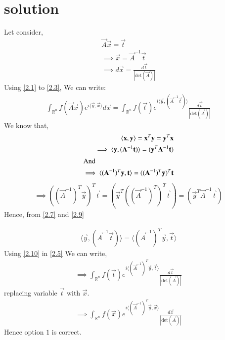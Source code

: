\documentclass[journal,12pt,twocolumn]{IEEEtran}
\numberwithin{table}{section}
\begin{document}
	\section{solution}
Let consider,
\begin{align}
\vec{A}\vec{x} = \vec{t} \label{2.1}\\
\implies \vec{x} = \vec{A}^{-1}\vec{t} \label{2.2}\\
\implies d\vec{x} = \frac{d\vec{t}}{ \left | \text{det} (\vec{A}) \right |} \label{2.3}
\end{align}
Using  \eqref{2.1} to \eqref{2.3}, We can write: 
\begin{multline}
\int_{\mathbb{R}^n} f(\vec{A}\vec{x}) e^{i\langle \vec{y},\vec{x}\rangle} d\vec{x}  = \int_{\mathbb{R}^n} f(\vec{t}) e^{i \langle \vec{y},(\vec{A}^{-1}\vec{t})\rangle} \frac{d\vec{t}}{\left| \text{det}(\vec{A}) \right|} \label{2.5}
\end{multline}
We know that,
\begin{align}
\langle \vec{x},\vec{y} \rangle = \vec{x}^T\vec{y} = \vec{y}^T\vec{x}\\
\implies \langle \vec{y}, (\vec{A}^{-1}\vec{t})\rangle = (\vec{y}^T\vec{A}^{-1}\vec{t}) \label{2.7}\\
\intertext{And}
\implies  \langle (\vec{A}^{-1})^{T}\vec{y},\vec{t}\rangle = ((\vec{A}^{-1})^{T}\vec{y})^T\vec{t}
\end{align}
\begin{multline}
\implies   ((\vec{A}^{-1})^T\vec{y})^T\vec{t} = (\vec{y}^T((\vec{A}^{-1})^T)^T\vec{t}) = (\vec{y}^T\vec{A}^{-1}\vec{t}) \label{2.9}
\end{multline}
Hence, from \eqref{2.7} and \eqref{2.9}

\begin{align}
 \langle \vec{y}, (\vec{A}^{-1}\vec{t})\rangle  =  \langle(\vec{A}^{-1})^{T}\vec{y},\vec{t} \rangle    \label{2.10}
\end{align}
Using \eqref{2.10} in \eqref{2.5} We can write,
\begin{align}
\implies \int_{\mathbb{R}^n} f(\vec{t}) e^{i \langle (\vec{A}^{-1})^{T}\vec{y},\vec{t} \rangle} \frac{d\vec{t}}{\left| \text{det}(\vec{A}) \right|}
\end{align}
replacing variable  $\vec{t}$ with $\vec{x}$.
\begin{align}
\implies \int_{\mathbb{R}^n} f(\vec{x}) e^{i \langle (\vec{A}^{-1})^{T}\vec{y},\vec{x} \rangle} \frac{d\vec{x}}{\left| \text{det}(\vec{A}) \right|} \label{2.11}
\end{align}
Hence option $1$ is correct.
\end{document}
